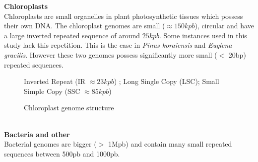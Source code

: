\documentclass[12pt, twocolumn]{article}
\begin{document}
\textbf{Chloroplasts} \\
Chloroplasts are small organelles in plant photosynthetic tissues which possess their own DNA. The chloroplast genomes are small ($\approx 150kpb$), circular and have a large inverted repeated sequence of around $25kpb$. Some instances used in this study lack this repetition. This is the case in \textit{Pinus koraiensis} and \textit{Euglena gracilis}. However these two genomes possess significantly more small ($<$ 20bp) repeated sequences. 
\begin{figure}[h!]
\centering
{}
\caption{Chloroplast genome structure}
{\footnotesize Inverted Repeat (IR $ \approx 23kpb$) ; Long Single Copy (LSC); Small Simple Copy (SSC $\approx 85kpb$)}
\end{figure} \\

\textbf{Bacteria and other} \\
Bacterial genomes are bigger ($>$ 1Mpb) and contain many small repeated sequences between 500pb and 1000pb.
\end{document}
